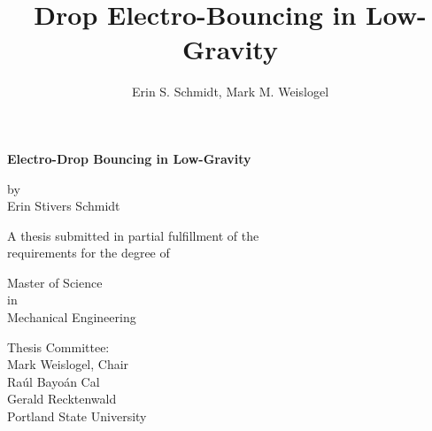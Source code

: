 \documentclass[12pt,a4paper,oneside]{book}
\title{\textsf{\textbf{Drop Electro-Bouncing in Low-Gravity}}}
\author{Erin S. Schmidt, Mark M. Weislogel}
\date{}
\newcommand\blankpage{%
    \null
    \thispagestyle{empty}%
    \addtocounter{page}{-1}%
    \newpage}
\begin{document}
\newcommand{\redline}{\raisebox{2pt}{\tikz{\draw[-,red,solid,line width = 1.5pt](0,0) -- (5mm,0);}}}
\begin{titlepage}
\doublespacing

\centering %
{\large \textsf{\textbf{Electro-Drop Bouncing in Low-Gravity}}}

\vspace{15ex}
by\\
Erin Stivers Schmidt

\vspace{15ex}
\singlespacing
A thesis submitted in partial fulfillment of the\\
requirements for the degree of

\vspace{11ex}
Master of Science\\
in\\
Mechanical Engineering

\vspace{12ex}
Thesis Committee:\\
Mark Weislogel, Chair\\
Ra\'ul Bayo\'an Cal\\
Gerald Recktenwald\\


\vfill
\vspace{2ex}
Portland State University\\%
{\number\year}
\end{titlepage}


\clearpage

\frontmatter
\end{document}
